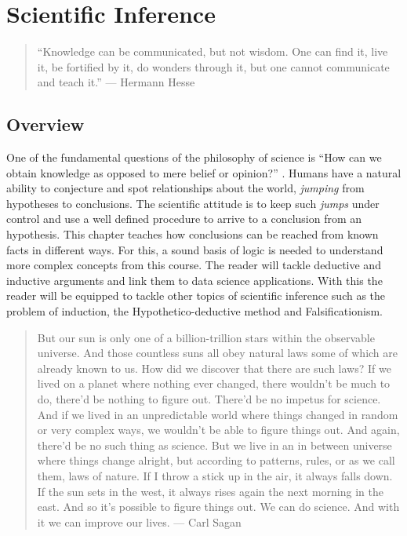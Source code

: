 \documentclass[
  12pt,
]{book}
\begin{document}
\chapter{Scientific Inference}\label{scientific-inference}

\begin{quote}
``Knowledge can be communicated, but not wisdom. One can find it, live it, be fortified by it, do wonders through it, but one cannot communicate and teach it.'' --- Hermann Hesse
\end{quote}

\section{Overview}\label{overview}

One of the fundamental questions of the philosophy of science is ``How can we obtain knowledge as opposed to mere belief or opinion?'' \citep{ladyman2012understanding}. Humans have a natural ability to conjecture and spot relationships about the world, \emph{jumping} from hypotheses to conclusions. The scientific attitude is to keep such \emph{jumps} under control and use a well defined procedure to arrive to a conclusion from an hypothesis. This chapter teaches how conclusions can be reached from known facts in different ways. For this, a sound basis of logic is needed to understand more complex concepts from this course. The reader will tackle deductive and inductive arguments and link them to data science applications. With this the reader will be equipped to tackle other topics of scientific inference such as the problem of induction, the Hypothetico-deductive method and Falsificationism.

\begin{quote}
But our sun is only one of a billion-trillion stars within the observable universe. And those countless suns all obey natural laws some of which are already known to us. How did we discover that there are such laws? If we lived on a planet where nothing ever changed, there wouldn't be much to do, there'd be nothing to figure out. There'd be no impetus for science. And if we lived in an unpredictable world where things changed in random or very complex ways, we wouldn't be able to figure things out. And again, there'd be no such thing as science. But we live in an in between universe where things change alright, but according to patterns, rules, or as we call them, laws of nature. If I throw a stick up in the air, it always falls down. If the sun sets in the west, it always rises again the next morning in the east. And so it's possible to figure things out. We can do science. And with it we can improve our lives. --- Carl Sagan
\end{quote}
\end{document}
